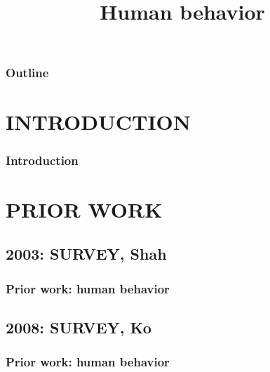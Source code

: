 
\title{Human behavior}
\begin{frame}[plain]\logoTechTower
	\titlepage
\end{frame}

\begin{frame}
\frametitle{Outline}
\logoCSIPCPL\logoTechTower
	\setcounter{tocdepth}{1}	
	\tableofcontents
\end{frame}

\section{INTRODUCTION}
\begin{frame}
\frametitle{Introduction}
\framesubtitle{}
\logoCSIPCPL\mypagenum
\end{frame}


\section{PRIOR WORK}

\subsection{2003: SURVEY, Shah}
\begin{frame}
\frametitle{Prior work: human behavior}
\framesubtitle{}
\mypagenum
{}
\end{frame}



\subsection{2008: SURVEY, Ko}
\begin{frame}
\frametitle{Prior work: human behavior}
\framesubtitle{}
\mypagenum
{}
\end{frame}




